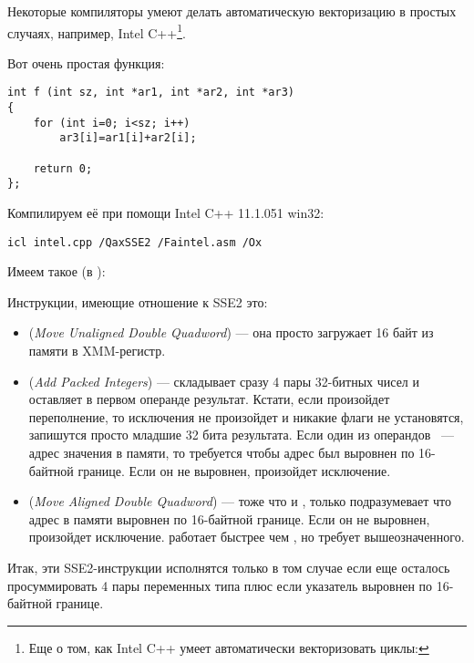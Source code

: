 Некоторые компиляторы умеют делать автоматическую векторизацию в простых случаях, 
например, Intel C++\footnote{Еще о том, как Intel C++ умеет автоматически векторизовать циклы: \URLINTELVEC}.

Вот очень простая функция:

\begin{lstlisting}[style=customc]
int f (int sz, int *ar1, int *ar2, int *ar3)
{
	for (int i=0; i<sz; i++)
		ar3[i]=ar1[i]+ar2[i];

	return 0;
};
\end{lstlisting}


Компилируем её при помощи Intel C++ 11.1.051 win32:

\begin{verbatim}
icl intel.cpp /QaxSSE2 /Faintel.asm /Ox
\end{verbatim}

Имеем такое (в \IDA):



Инструкции, имеющие отношение к SSE2 это:
\begin{itemize}
\item
\MOVDQU (\emph{Move Unaligned Double Quadword}) --- она просто загружает 16 байт из памяти в XMM-регистр.

\item
\PADDD (\emph{Add Packed Integers}) --- складывает сразу 4 пары 32-битных чисел и оставляет в первом операнде результат. 
Кстати, если произойдет переполнение, то исключения не произойдет и никакие флаги не установятся, 
запишутся просто младшие 32 бита результата. 
Если один из операндов \PADDD ~--- адрес значения в памяти, 
то требуется чтобы адрес был выровнен по 16-байтной границе. Если он не выровнен, произойдет исключение.

\item
\MOVDQA (\emph{Move Aligned Double Quadword}) --- тоже что и \MOVDQU, только подразумевает 
что адрес в памяти выровнен по 16-байтной границе. 
Если он не выровнен, произойдет исключение. 
\MOVDQA работает быстрее чем \MOVDQU, но требует вышеозначенного.

\end{itemize}

Итак, эти SSE2-инструкции исполнятся только в том случае если еще осталось просуммировать 
4 пары переменных типа \Tint плюс если указатель  выровнен по 16-байтной границе.

